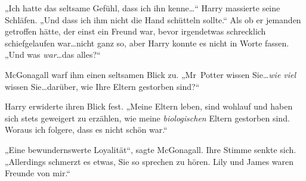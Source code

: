 „Ich hatte das seltsame Gefühl, dass ich ihn kenne…“ Harry massierte seine Schläfen. „Und dass ich ihm nicht die Hand schütteln sollte.“ Als ob er jemanden getroffen hätte, der einst ein Freund war, bevor irgendetwas schrecklich schiefgelaufen war…nicht ganz so, aber Harry konnte es nicht in Worte fassen. „Und was \emph{war}…das alles?“

McGonagall warf ihm einen seltsamen Blick zu. „Mr~Potter wissen Sie…\emph{wie viel} wissen Sie…darüber, wie Ihre Eltern gestorben sind?“

Harry erwiderte ihren Blick fest. „Meine Eltern leben, sind wohlauf und haben sich stets geweigert zu erzählen, wie meine \emph{biologischen} Eltern gestorben sind. Woraus ich folgere, dass es nicht schön war.“

„Eine bewundernswerte Loyalität“, sagte McGonagall. Ihre Stimme senkte sich. „Allerdings schmerzt es etwas, Sie so sprechen zu hören. Lily und James waren Freunde von mir.“

